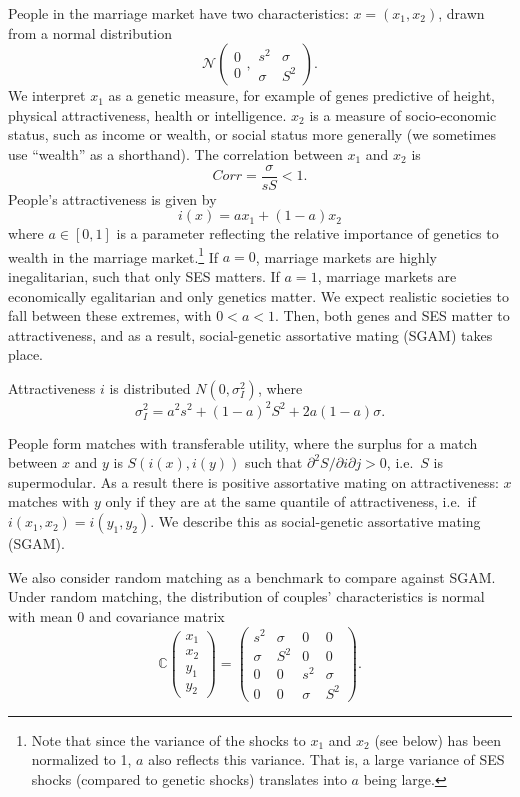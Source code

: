 \documentclass[
]{article}
\theoremstyle{definition}
\theoremstyle{definition}
\theoremstyle{definition}
\theoremstyle{definition}
\theoremstyle{remark}
\begin{document}
People in the marriage market have two characteristics:
\(x=\left( x_{1},x_{2}\right)\), drawn from a normal distribution
\[
\mathcal{N}
\left( 
\begin{array}{c}
0 \\ 
0%
\end{array}%
,%
\begin{array}{cc}
s^{2} & \sigma \\ 
\sigma & S^{2}%
\end{array}%
\right).
\]
We interpret \(x_1\) as a genetic measure, for example of genes predictive of
height, physical attractiveness, health or intelligence. \(x_2\) is a measure of
socio-economic status, such as income or wealth, or social status more generally
(we sometimes use ``wealth'' as a shorthand). The correlation between
\(x_1\) and \(x_2\) is
\[
Corr = \frac{\sigma }{sS} < 1.
\]
People's attractiveness is given by
\[
i\left( x\right) =ax_{1}+\left( 1-a\right) x_{2}
\]
where \(a \in [0, 1]\) is a parameter reflecting the relative importance of
genetics to wealth in the marriage market.\footnote{Note that since the variance of the shocks to \(x_1\) and \(x_2\)
  (see below) has been normalized to 1, \(a\) also reflects this variance. That
  is, a large variance of SES shocks (compared to genetic shocks) translates into
  \(a\) being large.} If \(a = 0\),
marriage markets are highly inegalitarian, such that only SES matters. If \(a = 1\), marriage markets are economically egalitarian and only genetics matter. We
expect realistic societies to fall between these extremes, with \(0 < a < 1\).
Then, both genes and SES matter to attractiveness, and as a result,
social-genetic assortative mating (SGAM) takes place.

Attractiveness \(i\) is
distributed \(N(0,\sigma_{I}^{2})\), where
\[
\sigma _{I}^{2}=a^{2}s^{2}+\left( 1-a\right) ^{2}S^{2}+2a\left( 1-a\right)\sigma.
\]

People form matches with transferable utility, where the surplus for a match
between \(x\) and \(y\) is \(S(i(x), i(y))\) such that \(\partial^{2}S/\partial i\partial j > 0\), i.e.~\(S\) is supermodular. As a result there is positive
assortative mating on attractiveness: \(x\) matches with \(y\) only if they are at
the same quantile of attractiveness, i.e.~if \(i(x_{1},x_{2}) = i(y_{1},y_{2})\).
We describe this as social-genetic assortative mating (SGAM).

We also consider random matching as a benchmark to compare against SGAM. Under
random matching, the distribution of couples' characteristics is normal with
mean 0 and covariance matrix
\[
\mathbb{C}\left( 
\begin{array}{c}
x_{1} \\ 
x_{2} \\ 
y_{1} \\ 
y_{2}%
\end{array}%
\right) =\allowbreak \left( 
\begin{array}{cccc}
s^{2} & \sigma & 0 & 0 \\ 
\sigma & S^{2} & 0 & 0 \\ 
0 & 0 & s^{2} & \sigma \\ 
0 & 0 & \sigma & S^{2}%
\end{array}%
\right). \allowbreak 
\]
\end{document}
